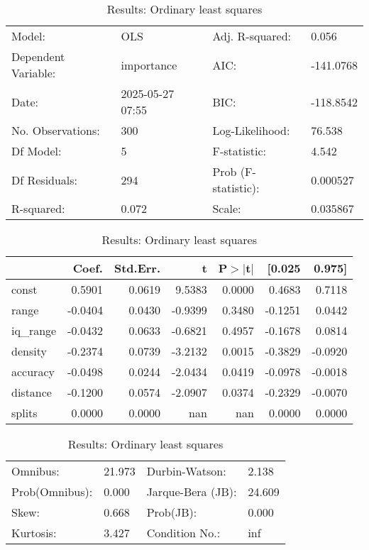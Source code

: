 \begin{table}
\caption{Results: Ordinary least squares}
\label{}
\begin{center}
\begin{tabular}{llll}
\hline
Model:              & OLS              & Adj. R-squared:     & 0.056      \\
Dependent Variable: & importance       & AIC:                & -141.0768  \\
Date:               & 2025-05-27 07:55 & BIC:                & -118.8542  \\
No. Observations:   & 300              & Log-Likelihood:     & 76.538     \\
Df Model:           & 5                & F-statistic:        & 4.542      \\
Df Residuals:       & 294              & Prob (F-statistic): & 0.000527   \\
R-squared:          & 0.072            & Scale:              & 0.035867   \\
\hline
\end{tabular}
\end{center}

\begin{center}
\begin{tabular}{lrrrrrr}
\hline
          &   Coef. & Std.Err. &       t & P$> |$t$|$ &  [0.025 &  0.975]  \\
\hline
const     &  0.5901 &   0.0619 &  9.5383 &      0.0000 &  0.4683 &  0.7118  \\
range     & -0.0404 &   0.0430 & -0.9399 &      0.3480 & -0.1251 &  0.0442  \\
iq\_range & -0.0432 &   0.0633 & -0.6821 &      0.4957 & -0.1678 &  0.0814  \\
density   & -0.2374 &   0.0739 & -3.2132 &      0.0015 & -0.3829 & -0.0920  \\
accuracy  & -0.0498 &   0.0244 & -2.0434 &      0.0419 & -0.0978 & -0.0018  \\
distance  & -0.1200 &   0.0574 & -2.0907 &      0.0374 & -0.2329 & -0.0070  \\
splits    &  0.0000 &   0.0000 &     nan &         nan &  0.0000 &  0.0000  \\
\hline
\end{tabular}
\end{center}

\begin{center}
\begin{tabular}{llll}
\hline
Omnibus:       & 21.973 & Durbin-Watson:    & 2.138   \\
Prob(Omnibus): & 0.000  & Jarque-Bera (JB): & 24.609  \\
Skew:          & 0.668  & Prob(JB):         & 0.000   \\
Kurtosis:      & 3.427  & Condition No.:    & inf     \\
\hline
\end{tabular}
\end{center}
\end{table}
